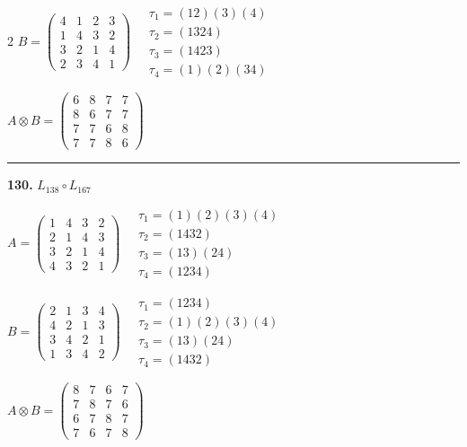 \begin{multicols}{2}
$B = \begin{pmatrix} 4 & 1 & 2 & 3 \\ 1 & 4 & 3 & 2 \\ 3 & 2 & 1 & 4 \\ 2 & 3 & 4 & 1 \end{pmatrix} \quad \begin{matrix} \tau_{1}=(1 2)(3)(4) \\ \tau_{2}=(1 3 2 4) \\ \tau_{3}=(1 4 2 3) \\ \tau_{4}=(1)(2)(3 4) \end{matrix}$

$A \otimes B = \begin{pmatrix} 6 & 8 & 7 & 7 \\ 8 & 6 & 7 & 7 \\ 7 & 7 & 6 & 8 \\ 7 & 7 & 8 & 6 \end{pmatrix}$

\vspace{0.3em}
\hrule
\vspace{0.3em}

\noindent\textbf{130.} $L_{138} \circ L_{167}$

$A = \begin{pmatrix} 1 & 4 & 3 & 2 \\ 2 & 1 & 4 & 3 \\ 3 & 2 & 1 & 4 \\ 4 & 3 & 2 & 1 \end{pmatrix} \quad \begin{matrix} \tau_{1}=(1)(2)(3)(4) \\ \tau_{2}=(1 4 3 2) \\ \tau_{3}=(1 3)(2 4) \\ \tau_{4}=(1 2 3 4) \end{matrix}$

$B = \begin{pmatrix} 2 & 1 & 3 & 4 \\ 4 & 2 & 1 & 3 \\ 3 & 4 & 2 & 1 \\ 1 & 3 & 4 & 2 \end{pmatrix} \quad \begin{matrix} \tau_{1}=(1 2 3 4) \\ \tau_{2}=(1)(2)(3)(4) \\ \tau_{3}=(1 3)(2 4) \\ \tau_{4}=(1 4 3 2) \end{matrix}$

$A \otimes B = \begin{pmatrix} 8 & 7 & 6 & 7 \\ 7 & 8 & 7 & 6 \\ 6 & 7 & 8 & 7 \\ 7 & 6 & 7 & 8 \end{pmatrix}$


\end{multicols}
